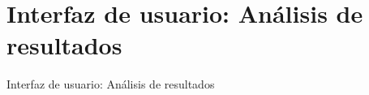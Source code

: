 \section{Interfaz de usuario: Análisis de resultados}
    Interfaz de usuario: Análisis de resultados